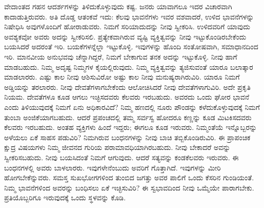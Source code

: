 \vskip 0.2cm

ವೇದಾಂತದ ಗಹನ ಆದರ್ಶಗಳನ್ನು ತಿಳಿದುಕೊಳ್ಳುವುದು ಕಷ್ಟ. ಜನರು ಯಾವಾಗಲೂ ಇದರ ವಿಚಾರವಾಗಿ ಕಾದಾಡುತ್ತಿರುವರು. ಅತಿ ದೊಡ್ಡ ಆತಂಕವೆ ಇದು: ಕೆಲವು ಭಾವನೆಗಳು ಇವರ ವಶವಾದರೆ, ಉಳಿದ ಭಾವನೆಗಳನ್ನು ನಿಷೇಧಿಸಿ ಅವುಗಳೊಂದಿಗೆ ಹೋರಾಡುವರು. ನಿಮಗೆ ಸರಿಯಾದುದನ್ನು ನೀವು ಸ್ವೀಕರಿಸಿ. ಉಳಿದವರಿಗೆ ಯಾವುದು ಅವಶ್ಯಕವೋ ಅವರು ಅದನ್ನು ಸ್ವೀಕರಿಸಲಿ. ಪ್ರತ್ಯೇಕವಾಗಿರುವ ವ್ಯಷ್ಟಿ ವ್ಯಕ್ತಿತ್ವವನ್ನು ನೀವು ಇಟ್ಟುಕೊಂಡಿರಬೇಕೆಂದು ಬಯಸಿದರೆ ಅದರಂತೆ ಇರಿ. ಬಯಕೆಗಳನ್ನೆಲ್ಲಾ ಇಟ್ಟುಕೊಳ್ಳಿ. ಇವುಗಳನ್ನು ಹೊಂದಿ ಸಂತೋಷವಾಗಿ, ಸಮಾಧಾನದಿಂದ ಇರಿ. ಮಾನವೀಯ ಅನುಭವವು ಚೆನ್ನಾಗಿದ್ದರೆ, ನಿಮಗೆ ಬೇಕಾಗುವ ತನಕ ಅದನ್ನು ಇಟ್ಟುಕೊಳ್ಳಿ. ನೀವು ಹಾಗೆ ಮಾಡಬಹುದು. ನಿಮ್ಮ ಅದೃಷ್ಟ ನಿಮ್ಮಗಳ ಕೈಯಲ್ಲಿರುವುದು. ನಿಮ್ಮ ವ್ಯಕ್ತಿತ್ವವನ್ನು ತ್ಯಜಿಸುವಂತೆ ಯಾರೂ ಬಲಾತ್ಕಾರ ಮಾಡಲಾರರು. ಎಷ್ಟು ಕಾಲ ನೀವು ಆಶಿಸುವಿರೋ ಅಷ್ಟು ಕಾಲ ನೀವು ಮನುಷ್ಯರಾಗಿರುವಿರಿ. ಯಾರೂ ನಿಮಗೆ ಅಡ್ಡಿಯನ್ನು ತರಲಾರರು. ನೀವು ದೇವತೆಗಳಾಗಬೇಕೆಂದು ಆಲೋಚಿಸಿದರೆ ನೀವು ದೇವತೆಗಳಾಗುವಿರಿ. ಅದೇ ಪ್ರಕೃತಿ ನಿಯಮ. ದೇವತೆಗಳೂ ಕೂಡ ಆಗಲು ಇಚ್ಛಿಸದವರು ಕೆಲವರು ಇರಬಹುದು. ಅವರದು ಒಂದು ಘೋರ ಭಾವನೆ ಎಂದು ತಿಳಿಯುವುದಕ್ಕೆ ನಿಮಗೆ ಏನು ಅಧಿಕಾರವಿದೆ? ನಿಮ್ಮ ಹಣದಲ್ಲಿ ನೂರು ಪೌಂಡನ್ನು ಕಳೆದುಕೊಳ್ಳುವುದಕ್ಕೆ ನಿಮಗೆ ತುಂಬಾ ಅಂಜಿಕೆಯಾಗಬಹುದು. ಆದರೆ ಪ್ರಪಂಚದಲ್ಲಿ ತಮ್ಮ ಸರ್ವಸ್ವ ಹೋದರೂ ಕಣ್ಣನ್ನು ಕೂಡ ಮಿಟಕಿಸದವರು ಕೆಲವರು ಇರಬಹುದು. ಅಂತಹ ವ್ಯಕ್ತಿಗಳು ಹಿಂದೆ ಇದ್ದರು; ಈಗಲೂ ಕೂಡ ಇರುವರು. ನಿಮ್ಮಂತೆಯೆ ಇನ್ನೊಬ್ಬರನ್ನು ಅಳೆಯಲು ಏಕೆ ಸಾಹಸ ಪಡುವಿರಿ? ನಿಮಗಿರುವ ಬಂಧನಗಳನ್ನು ನೀವು ಬಾಚಿ ತಬ್ಬಿಕೊಂಡಿರುವಿರಿ. ಈ ಪ್ರಾಪಂಚಿಕ ಕ್ಷುದ್ರ ವಿಷಯಗಳು ನಿಮ್ಮ ಜೀವನದ ಗುರಿಯ ಪರಾಮಾವಧಿಯಾಗಿರಬಹುದು. ನೀವು ಬೇಕಾದರೆ ಅವನ್ನು ಸ್ವೀಕರಿಸಬಹುದು. ನೀವು ಬಯಸಿದಂತೆ ನಿಮಗೆ ಆಗುವುದು. ಆದರೆ ಸತ್ಯವನ್ನು ಕಂಡ\break ಕೆಲವರು ಇರುವರು. ಈ ಬಂಧನಗಳಲ್ಲಿ ಅವರು ಬಾಳಲಾರರು. ಇವುಗಳೇನೆಂಬುದು ಅವರಿಗೆ ಗೊತ್ತಾಗಿದೆ. ಇವುಗಳನ್ನು ಮೀರಿ ಹೋಗಬೇಕೆನ್ನುವರು. ಸಮಸ್ತ ಸುಖಭೋಗಗಳಿಂದ ತುಂಬಿದ ಜಗತ್ತು ಅವರ ಪಾಲಿಗೆ ಒಂದು ಕೆಸರಿನ ಗುಂಡಿಯಂತೆ. ನಿಮ್ಮ ಭಾವನೆಗಳಿಂದ ಅವರನ್ನು ಬಂಧಿಸಲು ಏಕೆ ಇಚ್ಛಿಸುವಿರಿ? ಈ ಸ್ವಭಾವದಿಂದ ನೀವು ಒಮ್ಮೆಯೇ ಪಾರಾಗಬೇಕು. ಪ್ರತಿಯೊಬ್ಬರಿಗೂ ಇರುವುದಕ್ಕೆ ಒಂದು ಸ್ಥಳವನ್ನು ಕೊಡಿ. 

\vskip 0.2cm


